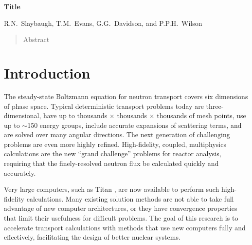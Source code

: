 \documentclass[preprint,12pt]{elsarticle}
\begin{document}
\setcounter{page}{2}
  

\begin{center}

  {\large \bf Title}
  
  \vspace{0.3in}
  
  R.N.\ Slaybaugh, T.M.\ Evans, G.G.\ Davidson, and P.P.H.\ Wilson
  
\end{center}

\doublespacing

\vspace{0.3in}

\begin{abstract}

  Abstract

\end{abstract}

\newpage


\section{Introduction}
\label{sec:intro}
The steady-state Boltzmann equation for neutron transport covers six dimensions of phase space. Typical deterministic transport problems today are three-dimensional, have up to thousands $\times$ thousands $\times$ thousands of mesh points, use up to $\sim$150 energy groups, include accurate expansions of scattering terms, and are solved over many angular directions. The next generation of challenging problems are even more highly refined. High-fidelity, coupled, multiphysics calculations are the new ``grand challenge'' problems for reactor analysis, requiring that the finely-resolved neutron flux be calculated quickly and accurately.

Very large computers, such as Titan \cite{Titan2013}, are now available to perform such high-fidelity calculations. Many existing solution methods are not able to take full advantage of new computer architectures, or they have convergence properties that limit their usefulness for difficult problems. The goal of this research is to accelerate transport calculations with methods that use new computers fully and effectively, facilitating the design of better nuclear systems. 
\end{document}
